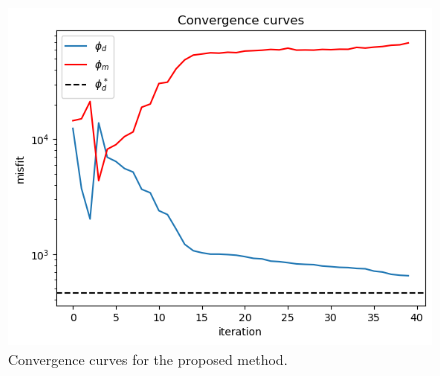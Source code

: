 \begin{figure}[htb]
    \vspace{-0.1cm}
    \begin{center}
    \includegraphics[width=\columnwidth]{figures/seg-guided-curves.png}
    \end{center}
    \vspace{-0.5cm}
\caption{
    Convergence curves for the proposed method.
}
\label{fig:curves}
\vspace{-0.1cm}
\end{figure}
